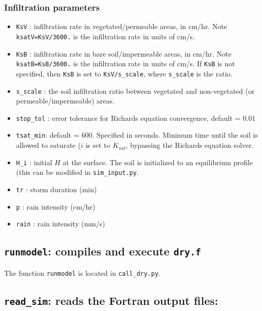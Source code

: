 \documentclass{article}
\newcommand{\code}[1]{\texttt{#1}}
\begin{document}
\subsubsection*{Infiltration parameters}
\begin{itemize}
	\item \code{KsV} : infiltration rate in vegetated/permeable areas, in cm/hr.  
		\subitem  Note \code{ksatV=KsV/3600.} is the infiltration rate in units of cm/s.
	\item \code{KsB} : infiltration rate in bare soil/impermeable areas, in cm/hr.  
		\subitem  Note \code{ksatB=KsB/3600.} is the infiltration rate in units of cm/s.
		\subitem If \code{KsB} is not specified, then \code{KsB} is set to \code{KsV/s\_scale}, where \code{s\_scale} is the ratio.
	\item \code{s\_scale} : the soil infiltration ratio between vegetated and non-vegetated (or permeable/impermeable) areas.	
	
	\item \code{stop\_tol} : error tolerance for Richards equation convergence, 	default = 0.01

	\item \code{tsat\_min}: default = 600.  Specified in seconds.  Minimum time until the soil is allowed to saturate ($i$ is set to $K_{sat}$, bypassing the Richards equation solver.
	\item \code{H\_i} : initial $H$ at the surface.  The soil is initialized to an equilibrium profile (this can be modified in \code{sim\_input.py}.
\end{itemize}

\begin{itemize}
	\item \code{tr} : storm duration (min)
	\item \code{p} : rain intensity (cm/hr)
	\item \code{rain} : rain intensity (mm/s)
\end{itemize}


\subsection{\code{runmodel}: compiles and execute \code{dry.f}}

The function \code{runmodel} is located in \code{call\_dry.py}.  

\subsection{\code{read\_sim}: reads the Fortran output files: }
\end{document}
